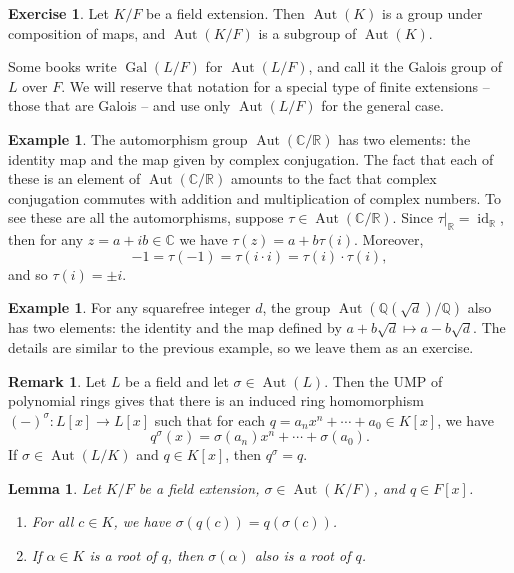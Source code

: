 \documentclass[12pt]{report}
\newtheorem{lemma}[theorem]{Lemma}
\numberwithin{equation}{section}
\numberwithin{theorem}{chapter}
\theoremstyle{definition}
\newtheorem{example}[theorem]{Example}
\newtheorem{exercise}{Exercise}
\newtheorem*{basic properties}{Basic Properties}
\newtheorem*{Important Remark}{Important Remark}
\newtheorem{remark}[theorem]{Remark}
\DeclareMathOperator{\Gal}{Gal}
\newcommand{\R}{\mathbb{R}}
\newcommand{\Q}{\mathbb{Q}}
\newcommand{\C}{\mathbb{C}}
\DeclareMathOperator{\id}{id}
\DeclareMathOperator{\Aut}{Aut}
\begin{document}
 
\begin{exercise} 
	Let $K/F$ be a field extension. Then $\Aut(K)$ is a group under composition of maps, and $\Aut(K/F)$ is a subgroup of $\Aut(K)$.
\end{exercise}


Some books write $\Gal(L/F)$ for $\Aut(L/F)$, and call it the Galois group of $L$ over $F$. We will reserve that notation for a special type of finite extensions -- those that are Galois -- and use only $\Aut(L/F)$ for the general case.


\begin{example}\label{example aut C over R}
The automorphism group $\Aut(\C/\R)$ has two elements: the identity map and the map given by complex conjugation. The fact that each of these is an element of $\Aut(\C/\R)$ amounts to the fact that complex conjugation commutes with addition and multiplication of complex numbers.
To see these are all the automorphisms, suppose $\tau \in \Aut(\C/\R)$. Since $\tau|_\R = \id_\R$, then for any $z = a + ib \in \C$ we have $\tau(z) = a + b \tau(i)$. Moreover, 
$$-1 =\tau(-1) = \tau(i \cdot i) = \tau(i) \cdot \tau(i),$$ 
and so $\tau(i) =\pm i$.
\end{example}



\begin{example}
For any squarefree integer $d$, the group $\Aut(\Q(\sqrt{d})/\Q)$ also has two elements: the identity and the map defined by $a + b \sqrt{d} \mapsto a - b \sqrt{d}$. The details are similar to the previous example, so we leave them as an exercise.
\end{example}

\begin{remark}\index{$(-)^\sigma$}\label{remark sigma}
Let $L$ be a field and let $\sigma \in \Aut(L)$. Then the UMP of polynomial rings gives that there is an induced ring homomorphism $(-)^\sigma\!:L[x]\to L[x]$ such that for each $q = a_nx^n + \cdots + a_0 \in K[x]$, we have
$$q^\sigma(x) = \sigma(a_n)x^n + \cdots + \sigma(a_0).$$ 
If $\sigma \in \Aut(L/K)$ and $q \in K[x]$, then $q^\sigma = q$.
\end{remark}


\begin{lemma}\label{lemma roots}
Let $K/F$ be a field extension, $\sigma \in \Aut(K/F)$, and $q \in F[x]$. 
\begin{enumerate}[label=\alph*),leftmargin=15pt]
\item For all $c \in K$, we have $\sigma(q(c))=q(\sigma(c))$. 
\item If $\alpha \in K$ is a root of $q$, then $\sigma(\alpha)$ also is a root of $q$.
\end{enumerate}
\end{lemma}
\end{document}
